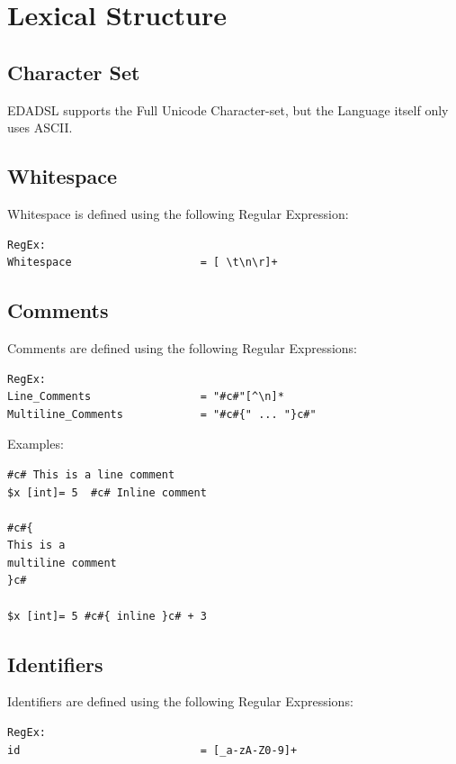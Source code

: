 \documentclass{report}
\begin{document}
\chapter{Lexical Structure}
\section{Character Set}
EDADSL supports the Full Unicode Character-set, but the Language itself only uses ASCII.
\section{Whitespace}
Whitespace is defined using the following Regular Expression:
\begin{verbatim}
RegEx:
Whitespace                    = [ \t\n\r]+
\end{verbatim}

\section{Comments}
Comments are defined using the following Regular Expressions:
\begin{verbatim}
RegEx:
Line_Comments                 = "#c#"[^\n]*
Multiline_Comments            = "#c#{" ... "}c#"
\end{verbatim}

Examples:
\begin{verbatim}
#c# This is a line comment
$x [int]= 5  #c# Inline comment

#c#{
This is a
multiline comment
}c#

$x [int]= 5 #c#{ inline }c# + 3
\end{verbatim}

\section{Identifiers}
Identifiers are defined using the following Regular Expressions:
\begin{verbatim}
RegEx:
id                            = [_a-zA-Z0-9]+
\end{verbatim}
\end{document}
